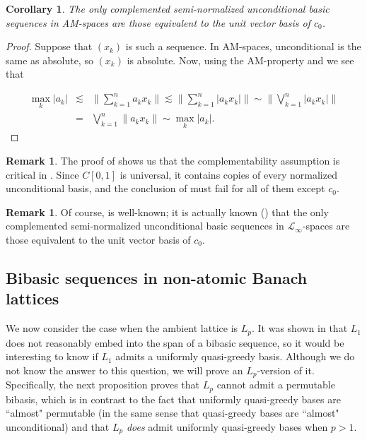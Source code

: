 \documentclass[12pt,leqno]{amsart}
\newtheorem{corollary}[theorem]{Corollary}
\numberwithin{equation}{section}
\theoremstyle{definition}
\newtheorem{remark}[theorem]{Remark}
\begin{document}
\begin{corollary}\label{Purely banach space}
The only complemented semi-normalized unconditional basic sequences in AM-spaces are those equivalent to the unit vector basis of $c_0$. 
\end{corollary}
\begin{proof}
Suppose that $(x_k)$ is such a sequence. In AM-spaces, unconditional is the same as absolute, so $(x_k)$ is absolute. Now, using the AM-property and  we see that

 \begin{eqnarray*}
     \max_k{|a_k|} &\lesssim& \|\sum_{k=1}^na_kx_k\|\lesssim \|\sum_{k=1}^n|a_kx_k|\|\sim \|\bigvee_{k=1}^n |a_kx_k|\|\\
     &=&\bigvee_{k=1}^n\|a_kx_k\|\sim \max_k{|a_k|}.
 \end{eqnarray*}

\end{proof}
\begin{remark}
The proof of  shows us that the complementability assumption is critical in . Since $C[0,1]$ is universal, it contains  copies of every normalized unconditional basis, and the conclusion of  must fail for all of them except $c_0$.
\end{remark}

\begin{remark}
Of course,  is well-known; it is actually known (\cite[p.~74]{DJT}) that the only complemented semi-normalized unconditional basic sequences in $\mathcal{L}_\infty$-spaces are those equivalent to the unit vector basis of $c_0$. 
\end{remark}



\subsection{Bibasic sequences in non-atomic Banach lattices}\label{Ambient}
We now consider the case when the ambient lattice is $L_p$. It was shown in \cite{TT19} that $L_1$ does not reasonably embed into the span of a bibasic sequence, so it would be interesting to know if $L_1$ admits a uniformly quasi-greedy basis. Although we do not know the answer to this question, we will prove an $L_p$-version of it. Specifically, the next proposition proves that $L_p$ cannot admit a permutable bibasis, which is in contrast to the fact that uniformly quasi-greedy bases are ``almost" permutable (in the same sense that quasi-greedy bases are ``almost" unconditional) and that $L_p$ \textit{does} admit uniformly quasi-greedy bases when $p>1$. 
\medskip
\end{document}
